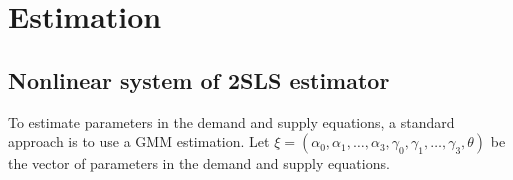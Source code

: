 \documentclass[11pt, a4paper]{article}
\begin{document}
\section{Estimation}

\subsection{Nonlinear system of 2SLS estimator}
To estimate parameters in the demand and supply equations, a standard approach is to use a GMM estimation.
Let $\xi = (\alpha_0,\alpha_1, \ldots, \alpha_3, \gamma_0,\gamma_1, \ldots, \gamma_3, \theta)$ be the vector of parameters in the demand and supply equations.
\end{document}
